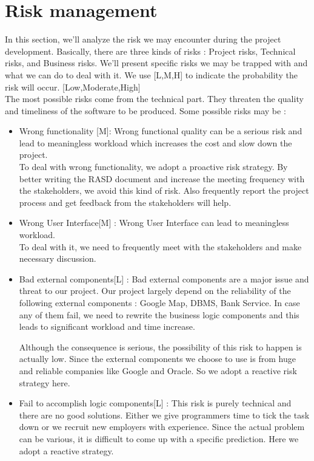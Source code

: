 \documentclass{article}
\begin{document}
\section{Risk management}
In this section, we'll analyze the risk we may encounter during the project development. Basically, there are three kinds of risks : Project risks, Technical risks, and Business risks. We'll present specific risks we may be trapped with and what we can do to deal with it. We use [L,M,H] to indicate the probability the risk will occur. [Low,Moderate,High]\\

The most possible risks come from the technical part. They threaten the quality and timeliness of the software to be produced. Some possible risks may be :
\begin{itemize}
	\item Wrong functionality [M]: Wrong functional quality can be a serious risk and lead to meaningless workload which increases the cost and slow down the project.\\
	To deal with wrong functionality, we adopt a proactive risk strategy. By better writing the RASD document and increase the meeting frequency with the stakeholders, we avoid this kind of risk. Also frequently report the project process and get feedback  from the stakeholders will help. 
	
	\item Wrong User Interface[M] : Wrong User Interface can lead to meaningless workload. \\
	To deal with it, we need to frequently meet with the stakeholders and make necessary discussion.
	
	\item Bad external components[L] : Bad external components are a major issue and threat to our project. Our project largely depend on the reliability of the following external components : Google Map, DBMS, Bank Service. In case any of them fail, we need to rewrite the business logic components and this leads to significant workload and time increase.
	
	Although the consequence is serious, the possibility of this risk to happen is actually low. Since the external components we choose to use is from huge and reliable companies like Google and Oracle. So we adopt a reactive risk strategy here. 
	
	\item Fail to accomplish logic components[L] : This risk is purely technical and there are no good solutions. Either we give programmers time to tick the task down or we recruit new employers with experience. Since the actual problem can be various, it is difficult to come up with a specific  prediction. Here we adopt a reactive strategy.
\end{itemize}
\end{document}
